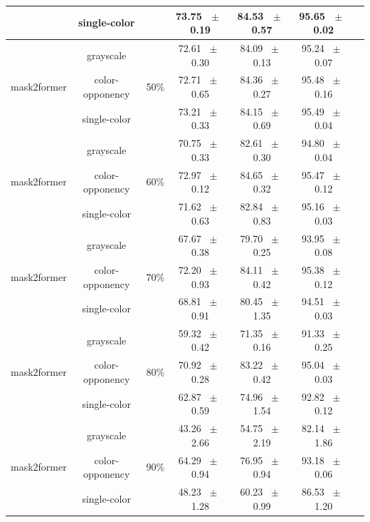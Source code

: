 \begin{table}[h]
\begin{tabular}{@{}lccc ccc@{}}
    & single-color &  & 73.75 ~$\pm$~ 0.19 & 84.53 ~$\pm$~ 0.57 & 95.65 ~$\pm$~ 0.02 \\
    \midrule
    \multirow{3}{*}{mask2former} & grayscale & \multirow{3}{*}{50\%} & 72.61 ~$\pm$~ 0.30 & 84.09 ~$\pm$~ 0.13 & 95.24 ~$\pm$~ 0.07 \\
    & color-opponency &  & 72.71 ~$\pm$~ 0.65 & 84.36 ~$\pm$~ 0.27 & 95.48 ~$\pm$~ 0.16 \\
    & single-color &  & 73.21 ~$\pm$~ 0.33 & 84.15 ~$\pm$~ 0.69 & 95.49 ~$\pm$~ 0.04 \\
    \midrule
    \multirow{3}{*}{mask2former} & grayscale & \multirow{3}{*}{60\%} & 70.75 ~$\pm$~ 0.33 & 82.61 ~$\pm$~ 0.30 & 94.80 ~$\pm$~ 0.04 \\
    & color-opponency &  & 72.97 ~$\pm$~ 0.12 & 84.65 ~$\pm$~ 0.32 & 95.47 ~$\pm$~ 0.12 \\
    & single-color &  & 71.62 ~$\pm$~ 0.63 & 82.84 ~$\pm$~ 0.83 & 95.16 ~$\pm$~ 0.03 \\
    \midrule
    \multirow{3}{*}{mask2former} & grayscale & \multirow{3}{*}{70\%} & 67.67 ~$\pm$~ 0.38 & 79.70 ~$\pm$~ 0.25 & 93.95 ~$\pm$~ 0.08 \\
    & color-opponency &  & 72.20 ~$\pm$~ 0.93 & 84.11 ~$\pm$~ 0.42 & 95.38 ~$\pm$~ 0.12 \\
    & single-color &  & 68.81 ~$\pm$~ 0.91 & 80.45 ~$\pm$~ 1.35 & 94.51 ~$\pm$~ 0.03 \\
    \midrule
    \multirow{3}{*}{mask2former} & grayscale & \multirow{3}{*}{80\%} & 59.32 ~$\pm$~ 0.42 & 71.35 ~$\pm$~ 0.16 & 91.33 ~$\pm$~ 0.25 \\
    & color-opponency &  & 70.92 ~$\pm$~ 0.28 & 83.22 ~$\pm$~ 0.42 & 95.04 ~$\pm$~ 0.03 \\
    & single-color &  & 62.87 ~$\pm$~ 0.59 & 74.96 ~$\pm$~ 1.54 & 92.82 ~$\pm$~ 0.12 \\
    \midrule
    \multirow{3}{*}{mask2former} & grayscale & \multirow{3}{*}{90\%} & 43.26 ~$\pm$~ 2.66 & 54.75 ~$\pm$~ 2.19 & 82.14 ~$\pm$~ 1.86 \\
    & color-opponency &  & 64.29 ~$\pm$~ 0.94 & 76.95 ~$\pm$~ 0.94 & 93.18 ~$\pm$~ 0.06 \\
    & single-color &  & 48.23 ~$\pm$~ 1.28 & 60.23 ~$\pm$~ 0.99 & 86.53 ~$\pm$~ 1.20 \\
    \midrule
    \bottomrule
  \end{tabular}
  \label{tab:sparse_results_mask2former_cityscapes}
\end{table}